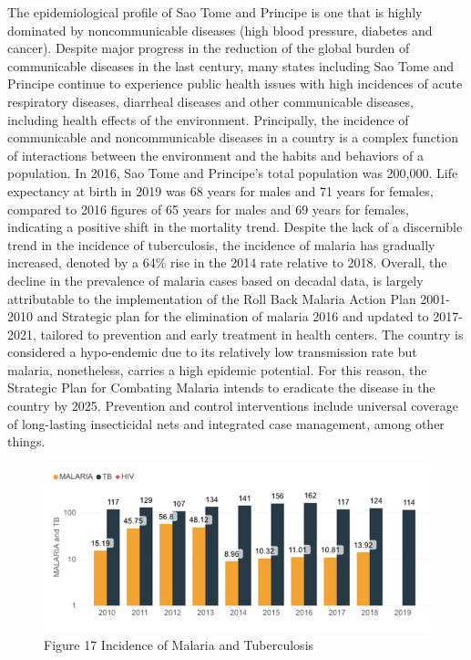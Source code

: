 \documentclass[
]{book}
\begin{document}
The epidemiological profile of Sao Tome and Principe is one that is highly dominated by noncommunicable diseases (high blood pressure, diabetes and cancer). Despite major progress in the reduction of the global burden of communicable diseases in the last century, many states including Sao Tome and Principe continue to experience public health issues with high incidences of acute respiratory diseases, diarrheal diseases and other communicable diseases, including health effects of the environment. Principally, the incidence of communicable and noncommunicable diseases in a country is a complex function of interactions between the environment and the habits and behaviors of a population. In 2016, Sao Tome and Principe's total population was 200,000. Life expectancy at birth in 2019 was 68 years for males and 71 years for females, compared to 2016 figures of 65 years for males and 69 years for females, indicating a positive shift in the mortality trend. Despite the lack of a discernible trend in the incidence of tuberculosis, the incidence of malaria has gradually increased, denoted by a 64\% rise in the 2014 rate relative to 2018. Overall, the decline in the prevalence of malaria cases based on decadal data, is largely attributable to the implementation of the Roll Back Malaria Action Plan 2001-2010 and Strategic plan for the elimination of malaria 2016 and updated to 2017-2021, tailored to prevention and early treatment in health centers. The country is considered a hypo-endemic due to its relatively low transmission rate but malaria, nonetheless, carries a high epidemic potential. For this reason, the Strategic Plan for Combating Malaria intends to eradicate the disease in the country by 2025. Prevention and control interventions include universal coverage of long-lasting insecticidal nets and integrated case management, among other things.

\begin{figure}
\centering
\includegraphics{images/malaria_tb.png}
\caption{Figure 17 Incidence of Malaria and Tuberculosis}
\end{figure}
\end{document}
